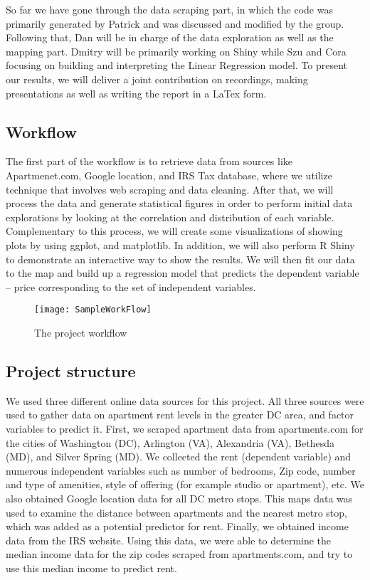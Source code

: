 \documentclass{article}
\begin{document}
So far we have gone through the data scraping part, in which the code was primarily generated by Patrick and was discussed and modified by the group. Following that, Dan will be in charge of the data exploration as well as the mapping part. Dmitry will be primarily working on Shiny while Szu and Cora focusing on building and interpreting the Linear Regression model. To present our results, we will deliver a joint contribution on recordings, making presentations as well as writing the report in a LaTex form.


\subsection{Workflow}

The first part of the workflow is to retrieve data from sources like Apartmenet.com, Google location, and IRS Tax database, where we utilize technique that involves web scraping and data cleaning. After that, we will process the data and generate statistical figures in order to perform initial data explorations by looking at the correlation and distribution of each variable. Complementary to this process, we will create some visualizations of showing plots by using ggplot, and matplotlib. In addition, we will also perform R Shiny to demonstrate an interactive way to show the results. We will then fit our data to the map and build up a regression model that predicts the dependent variable – price corresponding to the set of independent variables.

\begin{figure}[hb]
\graphicspath{{/Downloads}}
\centering
\texttt{[image: SampleWorkFlow]}
\caption{The project workflow}

\end{figure}

\subsection{Project structure}

We used three different online data sources for this project. All three sources were used to gather data on apartment rent levels in the greater DC area, and factor variables to predict it. First, we scraped apartment data from apartments.com for the cities of Washington (DC), Arlington (VA), Alexandria (VA), Bethesda (MD), and Silver Spring (MD). We collected the rent (dependent variable) and numerous independent variables such as number of bedrooms, Zip code, number and type of amenities, style of offering (for example studio or apartment), etc. We also obtained Google location data for all DC metro stops. This maps data was used to examine the distance between apartments and the nearest metro stop, which was added as a potential predictor for rent. Finally, we obtained income data from the IRS website. Using this data, we were able to determine the median income data for the zip codes scraped from apartments.com, and try to use this median income to predict rent.
\end{document}
